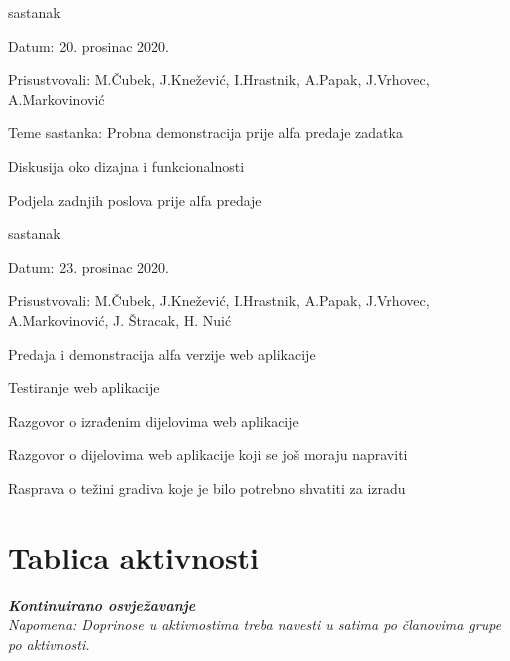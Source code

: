 \begin{packed_enum}
			\item  sastanak
			\item[] \begin{packed_item}
				\item Datum: 20. prosinac 2020.
				\item Prisustvovali: M.Čubek, J.Knežević, I.Hrastnik, A.Papak,  J.Vrhovec, A.Markovinović
				\item Teme sastanka: Probna demonstracija prije alfa predaje zadatka
				\begin{packed_item}
					\item Diskusija oko dizajna i funkcionalnosti
					\item Podjela zadnjih poslova prije alfa predaje
				\end{packed_item}
			\end{packed_item}
		
			\item  sastanak
			\item[] \begin{packed_item}
				\item Datum: 23. prosinac 2020.
				\item Prisustvovali: M.Čubek, J.Knežević, I.Hrastnik, A.Papak,  J.Vrhovec, A.Markovinović, J. Štracak, H. Nuić
				\item Predaja i demonstracija alfa verzije web aplikacije
				\begin{packed_item}
					\item Testiranje web aplikacije
					\item Razgovor o izrađenim dijelovima web aplikacije
					\item Razgovor o dijelovima web aplikacije koji se još moraju napraviti
					\item Rasprava o težini gradiva koje je bilo potrebno shvatiti za izradu
				\end{packed_item}
			\end{packed_item}
					
			
		\end{packed_enum}
		
		\eject
		\section*{Tablica aktivnosti}
		
			\textbf{\textit{Kontinuirano osvježavanje}}\\
			
			 \textit{Napomena: Doprinose u aktivnostima treba navesti u satima po članovima grupe po aktivnosti.}
					
